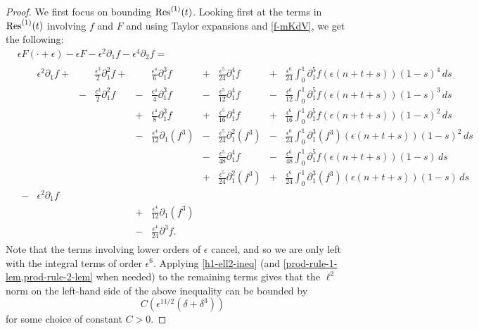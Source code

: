 \begin{proof}
	We first focus on bounding \(\mathrm{Res}^{(1)}(t)\). Looking first at the terms in \(\mathrm{Res}^{(1)}(t)\) involving \(f\) and \(F\) and using Taylor expansions and \cref{f-mKdV}, we get the following:
	\begin{equation}\label{F-res1}
		\begin{aligned}
			&\epsilon F(\cdot + \epsilon) - \epsilon F - \epsilon^2 \partial_1 f - \epsilon^4 \partial_2 f = \\
			&\begin{aligned}
				&\epsilon^2 \partial_1 f + & & \frac{\epsilon^3} 2 \partial_1^2 f +& &\frac{\epsilon^4} 6 \partial_1^3 f   & + &\frac{\epsilon^5}{24} \partial_1^4 f & + &\frac{\epsilon^6} {24} \int_0^1 \partial_1^5 f(\epsilon(n+t+s))(1-s)^4\, ds\\
				& & - &\frac{\epsilon^3} 2 \partial_1^2 f & - &\frac{\epsilon^4} 4 \partial_1^3 f & - & \frac{\epsilon^5} {12} \partial_1^4 f& - & \frac{\epsilon^6} {12} \int_0^1 \partial_1^5 f(\epsilon(n+t+s))(1-s)^3\, ds \\
				& & & & + &\frac {\epsilon^4} 8 \partial_1^3 f & + & \frac{\epsilon^5}{16} \partial_1^4 f  & + & \frac{\epsilon^6} {16} \int_0^1 \partial_1^5 f(\epsilon(n+t+s))(1-s)^2\, ds \\
				& & & & - &\frac {\epsilon^4} {12} \partial_1 (f^3) & - & \frac{\epsilon^5}{24} \partial_1^2(f^3) & - & \frac{\epsilon^6} {24} \int_0^1 \partial_1^3 (f^3)(\epsilon(n+t+s))(1-s)^2\, ds \\
				& & & & & & - & \frac{\epsilon^5}{48} \partial_1^4 f & - & \frac{\epsilon^6}{48} \int_0^1 \partial_1^5f(\epsilon(n+t+s))(1-s)\, ds \\
				& & & & & & + & \frac{\epsilon^5}{24} \partial_1^2 (f^3) & + & \frac{\epsilon^6}{24} \int_0^1 \partial_1^3 (f^3)(\epsilon(n+t+s)) (1-s)\, ds\\
				-&\epsilon^2 \partial_1 f \\
				& & & & + &\frac{\epsilon^4}{12}\partial_1(f^3) \\
				& & & & - &\frac{\epsilon^4}{24}\partial^3 f .
			\end{aligned}
		\end{aligned}
	\end{equation}
	Note that the terms involving lower orders of \(\epsilon\) cancel, and so we are only left with the integral terms of order \(\epsilon^6\). Applying \cref{h1-ell2-ineq} (and \cref{prod-rule-1-lem,prod-rule-2-lem} when needed) to the remaining terms gives that the \(\ell^2\) norm on the left-hand side of the above inequality can be bounded by \[C(\epsilon^{11/2}(\delta + \delta^3))\] for some choice of constant \(C>0\).
	

\end{proof}
